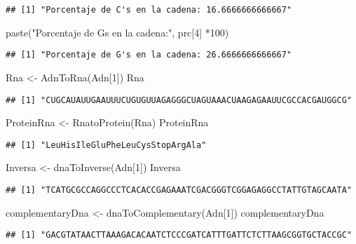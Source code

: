 \documentclass[
]{article}
\newenvironment{Shaded}{\begin{snugshade}}{\end{snugshade}}
\newcommand{\DecValTok}[1]{\textcolor[rgb]{0.00,0.00,0.81}{#1}}
\newcommand{\FunctionTok}[1]{\textcolor[rgb]{0.00,0.00,0.00}{#1}}
\newcommand{\NormalTok}[1]{#1}
\newcommand{\OtherTok}[1]{\textcolor[rgb]{0.56,0.35,0.01}{#1}}
\newcommand{\SpecialCharTok}[1]{\textcolor[rgb]{0.00,0.00,0.00}{#1}}
\newcommand{\StringTok}[1]{\textcolor[rgb]{0.31,0.60,0.02}{#1}}
\begin{document}
\begin{verbatim}
## [1] "Porcentaje de C's en la cadena: 16.6666666666667"
\end{verbatim}

\begin{Shaded}
\begin{Highlighting}[]
\FunctionTok{paste}\NormalTok{(}\StringTok{"Porcentaje de G\textquotesingle{}s en la cadena:"}\NormalTok{, prc[}\DecValTok{4}\NormalTok{] }\SpecialCharTok{*}\DecValTok{100}\NormalTok{)}
\end{Highlighting}
\end{Shaded}

\begin{verbatim}
## [1] "Porcentaje de G's en la cadena: 26.6666666666667"
\end{verbatim}

\begin{Shaded}
\begin{Highlighting}[]
\NormalTok{Rna }\OtherTok{\textless{}{-}} \FunctionTok{AdnToRna}\NormalTok{(Adn[}\DecValTok{1}\NormalTok{])}
\NormalTok{Rna}
\end{Highlighting}
\end{Shaded}

\begin{verbatim}
## [1] "CUGCAUAUUGAAUUUCUGUGUUAGAGGGCUAGUAAACUAAGAGAAUUCGCCACGAUGGCG"
\end{verbatim}

\begin{Shaded}
\begin{Highlighting}[]
\NormalTok{ProteinRna }\OtherTok{\textless{}{-}} \FunctionTok{RnatoProtein}\NormalTok{(Rna)}
\NormalTok{ProteinRna}
\end{Highlighting}
\end{Shaded}

\begin{verbatim}
## [1] "LeuHisIleGluPheLeuCysStopArgAla"
\end{verbatim}

\begin{Shaded}
\begin{Highlighting}[]
\NormalTok{Inversa }\OtherTok{\textless{}{-}} \FunctionTok{dnaToInverse}\NormalTok{(Adn[}\DecValTok{1}\NormalTok{])}
\NormalTok{Inversa}
\end{Highlighting}
\end{Shaded}

\begin{verbatim}
## [1] "TCATGCGCCAGGCCCTCACACCGAGAAATCGACGGGTCGGAGAGGCCTATTGTAGCAATA"
\end{verbatim}

\begin{Shaded}
\begin{Highlighting}[]
\NormalTok{complementaryDna }\OtherTok{\textless{}{-}} \FunctionTok{dnaToComplementary}\NormalTok{(Adn[}\DecValTok{1}\NormalTok{])}
\NormalTok{complementaryDna}
\end{Highlighting}
\end{Shaded}

\begin{verbatim}
## [1] "GACGTATAACTTAAAGACACAATCTCCCGATCATTTGATTCTCTTAAGCGGTGCTACCGC"
\end{verbatim}
\end{document}
